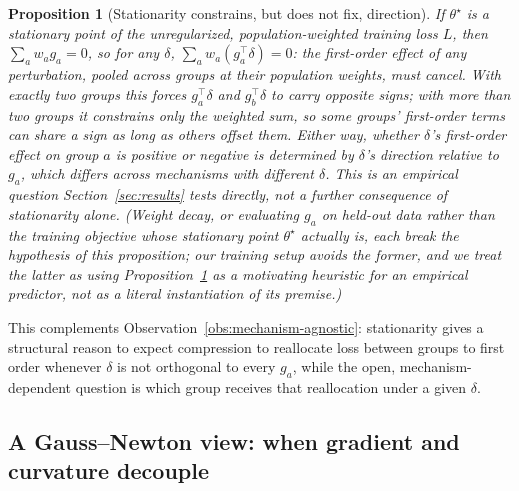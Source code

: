 \documentclass{article}
\newtheorem{proposition}{Proposition}
\newcommand{\theorig}{\theta^\star}
\begin{document}
\begin{proposition}[Stationarity constrains, but does not fix, direction]
\label{prop:stationarity}
If $\theorig$ is a stationary point of the \emph{unregularized, population-weighted training loss} $L$, then $\sum_a w_a g_a = 0$, so for any $\delta$, $\sum_a w_a (g_a^\top \delta) = 0$: the first-order effect of any perturbation, pooled across groups at their population weights, must cancel. With exactly two groups this forces $g_a^\top\delta$ and $g_b^\top\delta$ to carry opposite signs; with more than two groups it constrains only the weighted sum, so some groups' first-order terms can share a sign as long as others offset them. Either way, whether $\delta$'s first-order effect on group $a$ is positive or negative is determined by $\delta$'s direction relative to $g_a$, which differs across mechanisms with different $\delta$. This is an empirical question Section~\ref{sec:results} tests directly, not a further consequence of stationarity alone. (Weight decay, or evaluating $g_a$ on held-out data rather than the training objective whose stationary point $\theorig$ actually is, each break the hypothesis of this proposition; our training setup avoids the former, and we treat the latter as using Proposition~\ref{prop:stationarity} as a motivating heuristic for an empirical predictor, not as a literal instantiation of its premise.)
\end{proposition}
This complements Observation~\ref{obs:mechanism-agnostic}: stationarity gives a structural reason to expect compression to reallocate loss between groups to first order whenever $\delta$ is not orthogonal to every $g_a$, while the open, mechanism-dependent question is which group receives that reallocation under a given $\delta$.

\subsection{A Gauss--Newton view: when gradient and curvature decouple}
\label{sec:gauss-newton}
\end{document}
